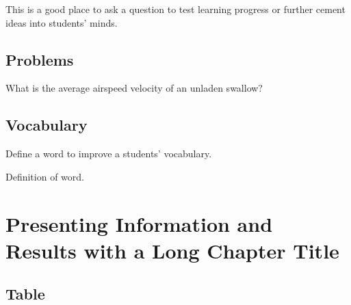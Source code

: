 \documentclass[
	11pt, %
	fleqn, %
	a4paper, %
]{LegrandOrangeBook}
\begin{document}
\begin{exercise} %
	This is a good place to ask a question to test learning progress or further cement ideas into students' minds.
\end{exercise}


\section{Problems}

\begin{problem} %
What is the average airspeed velocity of an unladen swallow?
\end{problem}


\section{Vocabulary}

Define a word to improve a students' vocabulary.

\begin{vocabulary}[Word] %
	Definition of word.
\end{vocabulary}


\chapterspaceabove{6.25cm} %
\chapterspacebelow{7.5cm} %


\chapter{Presenting Information and Results with a Long Chapter Title}

\section{Table}
\end{document}
